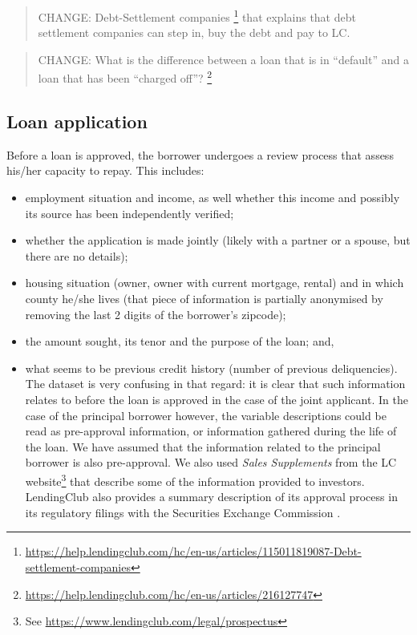 \documentclass[11pt,]{report}
\let\rmarkdownfootnote\footnote%
\def\footnote{\protect\rmarkdownfootnote}
\begin{document}
\begin{quote}
CHANGE: Debt-Settlement companies \footnote{\url{https://help.lendingclub.com/hc/en-us/articles/115011819087-Debt-settlement-companies}} that explains that debt settlement companies can step in, buy the debt and pay to LC.
\end{quote}

\begin{quote}
CHANGE: What is the difference between a loan that is in ``default'' and a loan that has been ``charged off''? \footnote{\url{https://help.lendingclub.com/hc/en-us/articles/216127747}}
\end{quote}

\hypertarget{loan-application}{%
\subsection{Loan application}\label{loan-application}}

Before a loan is approved, the borrower undergoes a review process that assess his/her capacity to repay. This includes:

\begin{itemize}
\item
  employment situation and income, as well whether this income and possibly its source has been independently verified;
\item
  whether the application is made jointly (likely with a partner or a spouse, but there are no details);
\item
  housing situation (owner, owner with current mortgage, rental) and in which county he/she lives (that piece of information is partially anonymised by removing the last 2 digits of the borrower's zipcode);
\item
  the amount sought, its tenor and the purpose of the loan; and,
\item
  what seems to be previous credit history (number of previous deliquencies). The dataset is very confusing in that regard: it is clear that such information relates to before the loan is approved in the case of the joint applicant. In the case of the principal borrower however, the variable descriptions could be read as pre-approval information, or information gathered during the life of the loan. We have assumed that the information related to the principal borrower is also pre-approval. We also used \emph{Sales Supplements} from the LC website\footnote{See \url{https://www.lendingclub.com/legal/prospectus}} that describe some of the information provided to investors. LendingClub also provides a summary description of its approval process in its regulatory filings with the Securities Exchange Commission \citep{LC201908S3}.
\end{itemize}
\end{document}
